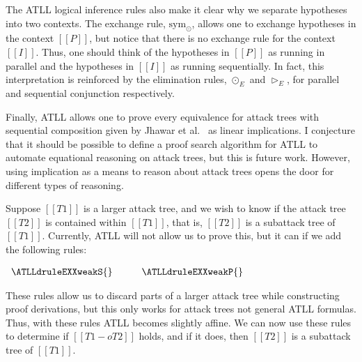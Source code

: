 The ATLL logical inference rules also make it clear why we separate
hypotheses into two contexts.  The exchange rule, $\text{sym}_\odot$,
allows one to exchange hypotheses in the context $[[P]]$, but notice
that there is no exchange rule for the context $[[I]]$.  Thus, one
should think of the hypotheses in $[[P]]$ as running in parallel and
the hypotheses in $[[I]]$ as running sequentially.  In fact, this
interpretation is reinforced by the elimination rules, $\odot_E$ and
$\rhd_E$, for parallel and sequential conjunction respectively.

Finally, ATLL allows one to prove every equivalence for attack trees
with sequential composition given by Jhawar et al.~\cite{Jhawar:2015}
as linear implications.  I conjecture that it should be possible to
define a proof search algorithm for ATLL to automate equational
reasoning on attack trees, but this is future work.  However, using
implication as a means to reason about attack trees opens the door for
different types of reasoning.

Suppose $[[T1]]$ is a larger attack tree, and we wish to know if the
attack tree $[[T2]]$ is contained within $[[T1]]$, that is, $[[T2]]$
is a subattack tree of $[[T1]]$.  Currently, ATLL will not allow us to
prove this, but it can if we add the following rules:
\begin{center}
  \begin{math}
    \begin{array}{lll}
      \ATLLdruleEXXweakS{} & \quad & \ATLLdruleEXXweakP{}
    \end{array}
  \end{math}
\end{center}
These rules allow us to discard parts of a larger attack tree while
constructing proof derivations, but this only works for attack trees
not general ATLL formulas.  Thus, with these rules ATLL becomes
slightly affine.  We can now use these rules to determine if
$[[T1 -o T2]]$ holds, and if it does, then $[[T2]]$ is a
subattack tree of $[[T1]]$.
